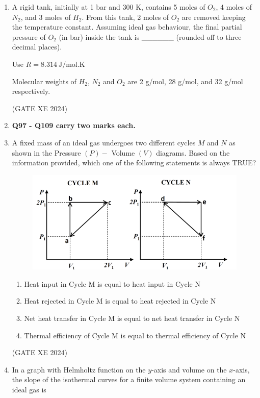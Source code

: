 \documentclass[12pt]{article}
\begin{document}
\begin{enumerate}
(GATE XE 2024)

\item A rigid tank, initially at 1 bar and 300 K, contains 5 moles of $O_2$, 4 moles of $N_2$, and 3 moles of $H_2$. From this tank, 2 moles of $O_2$ are removed keeping the temperature constant. Assuming ideal gas behaviour, the final partial pressure of $O_2$ (in bar) inside the tank is \_\_\_\_\_\_ (rounded off to three decimal places).  

Use $R = 8.314 \ \text{J/mol.K}$  

Molecular weights of $H_2$, $N_2$ and $O_2$ are 2 g/mol, 28 g/mol, and 32 g/mol respectively.  

(GATE XE 2024)

\item[] \textbf{Q97 - Q109 carry two marks each.}
\item A fixed mass of an ideal gas undergoes two different cycles $M$ and $N$ as shown in the Pressure $(P) -$ Volume $(V)$ diagrams. Based on the information provided, which one of the following statements is always TRUE?

\begin{figure}[H]
    \centering
    \includegraphics[width=0.5\columnwidth]{figs/ass5_d_q97.png}
    \caption{}
    \label{fig:placeholder}
\end{figure}

\begin{enumerate}
\item Heat input in Cycle M is equal to heat input in Cycle N
\item Heat rejected in Cycle M is equal to heat rejected in Cycle N
\item Net heat transfer in Cycle M is equal to net heat transfer in Cycle N
\item Thermal efficiency of Cycle M is equal to thermal efficiency of Cycle N
\end{enumerate}

(GATE XE 2024)

\item In a graph with Helmholtz function on the $y$-axis and volume on the $x$-axis, the slope of the isothermal curves for a finite volume system containing an ideal gas is


\end{enumerate}
\end{document}
